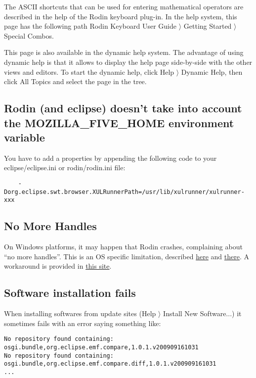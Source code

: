 The ASCII shortcuts that can be used for entering mathematical operators are described in the help of the Rodin keyboard plug-in. In the help system, this page has the following path \textsf{Rodin Keyboard User Guide $\rangle$ Getting Started $\rangle$ Special Combos}. 

This page is also available in the dynamic help system. The advantage of using dynamic help is that it allows to display the help page side-by-side with the other views and editors. To start the dynamic help, click \textsf{Help $\rangle$ Dynamic Help}, then click \textsf{All Topics} and select the page in the tree. 

\subsection{Rodin (and eclipse) doesn't take into account the MOZILLA_FIVE_HOME environment variable}

You have to add a properties by appending the following code to your \textsf{eclipse/eclipse.ini} or \textsf{rodin/rodin.ini} file: 

\begin{verbatim} 
	-Dorg.eclipse.swt.browser.XULRunnerPath=/usr/lib/xulrunner/xulrunner-xxx 
\end{verbatim} 

\subsection{No More Handles}

On Windows platforms, it may happen that Rodin crashes, complaining about ``no more handles''. This is an OS specific limitation, described \href{http://journals.jevon.org/users/jevon-phd/entry/19833}{here} and \href{https://bugs.eclipse.org/bugs/show_bug.cgi?id=211124}{there}. A workaround is provided in \href{http://blogs.msdn.com/b/ntdebugging/archive/2007/01/04/desktop-heap-overview.aspx}{this site}. 

\subsection{Software installation fails}

When installing softwares from update sites (\textsf{Help $\rangle$ Install New Software...}) it sometimes fails with an error saying something like: 

\begin{verbatim}
No repository found containing: osgi.bundle,org.eclipse.emf.compare,1.0.1.v200909161031
No repository found containing: osgi.bundle,org.eclipse.emf.compare.diff,1.0.1.v200909161031
...
\end{verbatim}

